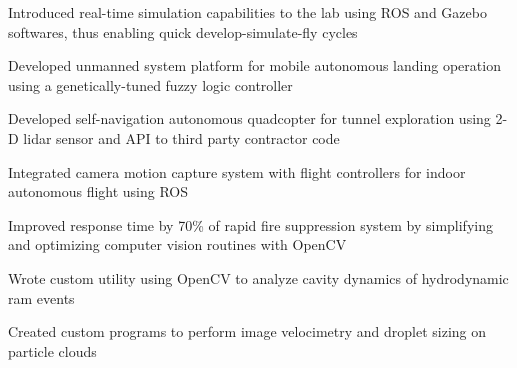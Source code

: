 \documentclass[letterpaper]{deedy-resume}
\begin{document}
\begin{minipage}[t]{0.66\textwidth}
    \begin{compactitem}
        \item Introduced real-time simulation capabilities to the lab using ROS and Gazebo softwares, thus
            enabling quick develop-simulate-fly cycles
        \item Developed unmanned system platform for mobile autonomous landing operation using a
            genetically-tuned fuzzy logic controller
        \item Developed self-navigation autonomous quadcopter for tunnel exploration using 2-D lidar sensor
            and API to third party contractor code
        \item Integrated camera motion capture system with flight controllers for indoor autonomous flight
            using ROS
    \end{compactitem}
    \vspace{3em}
    
    \begin{compactitem}
        \item Improved response time by 70\% of rapid fire suppression system by simplifying and optimizing
            computer vision routines with OpenCV
        \item Wrote custom utility using OpenCV to analyze cavity dynamics of hydrodynamic ram events
        \item Created custom programs to perform image velocimetry and droplet sizing on particle clouds
    \end{compactitem}


\end{minipage}
\end{document}
